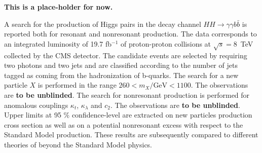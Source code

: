 {\bf This is a place-holder for now.}

A search for the production of Higgs pairs in the decay channel
$HH \rightarrow \gamma\gamma b\bar{b}$ is reported both for
resonant and nonresonant production. The data corresponds to an integrated
luminosity of 19.7 fb$^{-1}$ of proton-proton collisions at $\sqrt{s}=8$~TeV collected by the
CMS detector. The candidate events are selected by requiring two photons and two jets and are classified
according to the number of jets tagged as coming from the hadronization of b-quarks.
The search for a new particle $X$ is performed in the range $260 < m_X/\text{GeV} < 1100$.
The observations
are {\bf to be unblinded}.
The search for nonresonant production is performed for anomalous couplings
$\kappa_{t}$, $\kappa_{\lambda}$ and $c_2$.
The observations are {\bf to be unblinded}.
Upper limits at 95 $\%$ confidence-level are extracted on new particles production cross section
as well as on a potential nonresonant excess with respect to the Standard Model production.
These results are subsequently compared to different theories of beyond the Standard Model physics.
